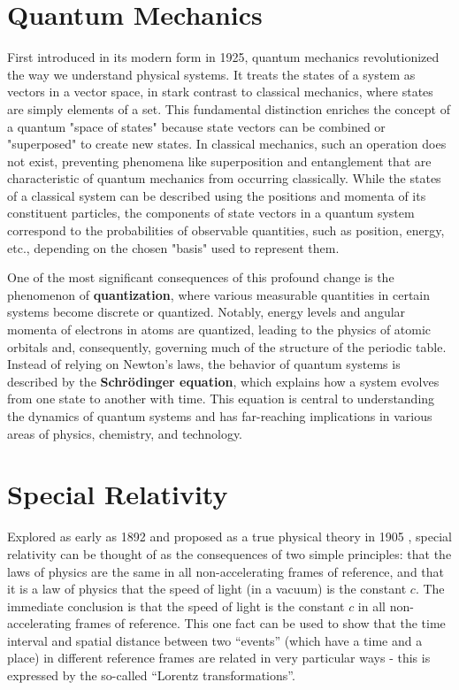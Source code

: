 \documentclass[12pt]{article}
\begin{document}
\section{Quantum Mechanics}

First introduced in its modern form in 1925, quantum mechanics revolutionized the way we understand physical systems. It treats the states of a system as vectors in a vector space, in stark contrast to classical mechanics, where states are simply elements of a set. This fundamental distinction enriches the concept of a quantum "space of states" because state vectors can be combined or "superposed" to create new states. In classical mechanics, such an operation does not exist, preventing phenomena like superposition and entanglement that are characteristic of quantum mechanics from occurring classically. While the states of a classical system can be described using the positions and momenta of its constituent particles, the components of state vectors in a quantum system correspond to the probabilities of observable quantities, such as position, energy, etc., depending on the chosen "basis" used to represent them.

One of the most significant consequences of this profound change is the phenomenon of \textbf{quantization}, where various measurable quantities in certain systems become discrete or quantized. Notably, energy levels and angular momenta of electrons in atoms are quantized, leading to the physics of atomic orbitals and, consequently, governing much of the structure of the periodic table. Instead of relying on Newton's laws, the behavior of quantum systems is described by the \textbf{Schrödinger equation}, which explains how a system evolves from one state to another with time. This equation is central to understanding the dynamics of quantum systems and has far-reaching implications in various areas of physics, chemistry, and technology.

\section{Special Relativity}

Explored as early as 1892 \cite{Lorentz_1892} and proposed as a true physical theory in 1905 \cite{Einstein_1905}, special relativity can be thought of as the consequences of two simple principles: that the laws of physics are the same in all non-accelerating frames of reference, and that it is a law of physics that the speed of light (in a vacuum) is the constant $c$. The immediate conclusion is that the speed of light is the constant $c$ in all non-accelerating frames of reference. This one fact can be used to show that the time interval and spatial distance between two ``events'' (which have a time and a place) in different reference frames are related in very particular ways - this is expressed by the so-called ``Lorentz transformations''.
\end{document}
